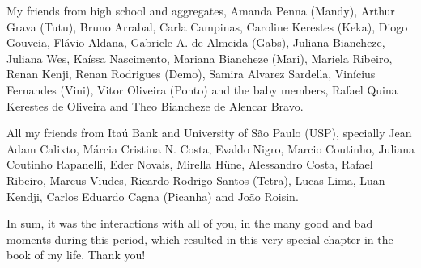 My friends from high school and aggregates, Amanda Penna (Mandy), Arthur Grava (Tutu), Bruno Arrabal, Carla Campinas, Caroline Kerestes (Keka), Diogo Gouveia, Flávio Aldana, Gabriele A. de Almeida (Gabs), Juliana Biancheze, Juliana Wes, Kaíssa Nascimento, Mariana Biancheze (Mari), Mariela Ribeiro, Renan Kenji, Renan Rodrigues (Demo), Samira Alvarez Sardella, Vinícius Fernandes (Vini), Vitor Oliveira (Ponto) and the baby members, Rafael Quina Kerestes de Oliveira and Theo Biancheze de Alencar Bravo.

All my friends from Itaú Bank and University of São Paulo (USP), specially Jean Adam Calixto, Márcia Cristina N. Costa, Evaldo Nigro, \linebreak Marcio Coutinho, Juliana Coutinho Rapanelli, Eder Novais, Mirella Hüne, Alessandro Costa, Rafael Ribeiro, Marcus Viudes, Ricardo Rodrigo Santos (Tetra), Lucas Lima, Luan Kendji, Carlos Eduardo Cagna (Picanha) and João Roisin.

In sum, it was the interactions with all of you, in the many good and bad moments during this period, which resulted in this very special chapter in the book of my life. Thank you!